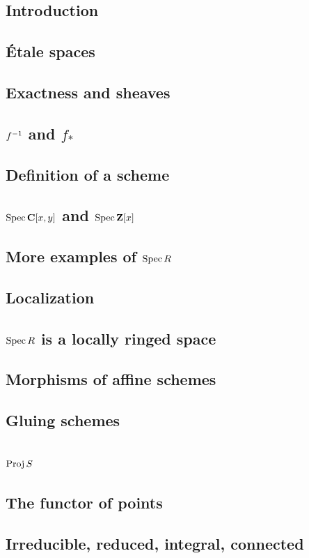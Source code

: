 \documentclass [11 pt, oneside, margin = 1 in] {article}
\begin{document}
\subsection{Introduction}
\subsection{\'Etale spaces}
\subsection{Exactness and sheaves}
\subsection{$f^{-1}$ and $f_*$}
\subsection{Definition of a scheme}
\subsection{$\operatorname{Spec} \mathbf C[x,y]$ and $\operatorname{Spec} \mathbf Z[x]$}
\subsection{More examples of $\operatorname{Spec} R$}
\subsection{Localization}
\subsection{$\operatorname{Spec} R$ is a locally ringed space}
\subsection{Morphisms of affine schemes}
\subsection{Gluing schemes}
\subsection{$\operatorname{Proj} S$}
\subsection{The functor of points}
\subsection{Irreducible, reduced, integral, connected}
\end{document}
